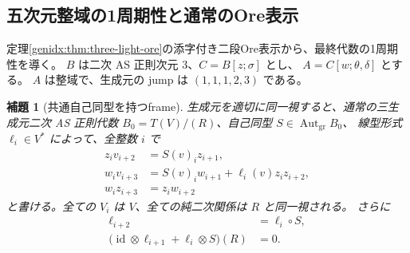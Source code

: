 \documentclass[11pt,a4paper]{ltjsarticle}
\newtheorem{lemma}[theorem]{補題}
\theoremstyle{definition}
\begin{document}
\subsection{五次元整域の1周期性と通常のOre表示}

定理\ref{genidx:thm:three-light-ore}の添字付き二段Ore表示から、最終代数の1周期性を導く。
$B$ は二次 AS 正則次元 3、$C=B[z;\sigma]$ とし、
$A=C[w;\theta,\delta]$ とする。
$A$ は整域で、生成元の jump は $(1,1,1,2,3)$ である。

\begin{lemma}[共通自己同型を持つframe]\label{n3desc:lem:common-frame}
生成元を適切に同一視すると、通常の三生成元二次 AS 正則代数
$B_0=T(V)/(R)$、自己同型 $S\in\operatorname{Aut}_{\mathrm{gr}}B_0$、
線型形式 $\ell_i\in V^*$ によって、全整数 $i$ で
\begin{equation}\label{nzred:eq:common-frame}
\begin{aligned}
z_i v_{i+2}&=S(v)_i z_{i+1},\\
w_i v_{i+3}&=S(v)_i w_{i+1}+\ell_i(v)z_i z_{i+2},\\
w_i z_{i+3}&=z_i w_{i+2}
\end{aligned}
\end{equation}
と書ける。全ての $V_i$ は $V$、全ての純二次関係は $R$ と同一視される。
さらに
\begin{align}
\ell_{i+2}&=\ell_i\circ S,\label{nzred:eq:two-step}\\
\bigl(\operatorname{id}\otimes\ell_{i+1}
  +\ell_i\otimes S\bigr)(R)&=0.
\label{nzred:eq:adjacent}
\end{align}
\end{lemma}
\end{document}

